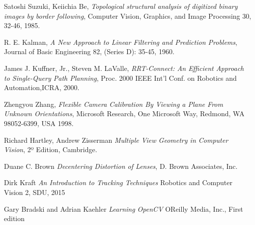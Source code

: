 \begin{thebibliography}{9}

	Satoshi Suzuki, Keiichia Be,
	\emph{Topological structural analysis of digitized binary images by border following},
	Computer Vision, Graphics, and Image Processing 30, 32-46,
	1985.
	
	R. E. Kalman,
	\emph{A New Approach to Linear Filtering and Prediction Problems},
	Journal of Basic Engineering 82, (Series D): 35-45,
	1960.

	James J. Kuffner, Jr., Steven M. LaValle,
	\emph{RRT-Connect: An Efficient Approach to Single-Query Path Planning},
	Proc. 2000 IEEE Int’l Conf. on Robotics and Automation,ICRA, 2000.

	Zhengyou Zhang,
	\emph{Flexible Camera Calibration By Viewing a Plane From Unknown Orientations},
	Microsoft Research, One Microsoft Way, Redmond, WA 98052-6399, USA
	1998.

	Richard Hartley, Andrew Zisserman
	\emph{Multiple View Geometry in Computer Vision},
	2º Edition, Cambridge.

	Duane C. Brown
	\emph{Decentering Distortion of Lenses},
	D. Brown Associates, Inc.

	Dirk Kraft
	\emph{An Introduction to Tracking Techniques}
	Robotics and Computer Vision 2, SDU, 2015

	Gary Bradski and Adrian Kaehler
	\emph{Learning OpenCV}
	OReilly Media, Inc., First edition

\end{thebibliography}